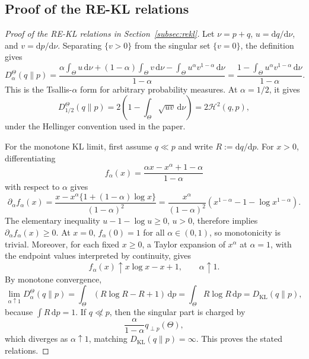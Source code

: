 \documentclass[11pt,a4paper]{article}
\theoremstyle{compactplain}
\theoremstyle{compactdefinition}
\numberwithin{equation}{section}
\begin{document}
\subsection*{Proof of the RE-KL relations}
\begin{proof}[Proof of the RE-KL relations in Section~\ref{subsec:rekl}]
Let \(\nu=p+q\), \(u=\mathrm dq/\mathrm d\nu\), and \(v=\mathrm dp/\mathrm d\nu\). Separating \(\{v>0\}\) from the singular set \(\{v=0\}\), the definition gives
\[
 D_\alpha^\Theta(q\|p)
 =\frac{\alpha\int_\Theta u\,\mathrm d\nu+(1-\alpha)\int_\Theta v\,\mathrm d\nu
       -\int_\Theta u^\alpha v^{1-\alpha}\,\mathrm d\nu}{1-\alpha}
 =\frac{1-\int_\Theta u^\alpha v^{1-\alpha}\,\mathrm d\nu}{1-\alpha}.
\]
This is the Tsallis-\(\alpha\) form for arbitrary probability measures. At \(\alpha=1/2\), it gives
\[
 D_{1/2}^\Theta(q\|p)
 =2\left(1-\int_\Theta\sqrt{uv}\,\mathrm d\nu\right)
 =2\mathcal H^2(q,p),
\]
under the Hellinger convention used in the paper.

For the monotone KL limit, first assume \(q\ll p\) and write \(R:=\mathrm dq/\mathrm dp\). For \(x>0\), differentiating
\[
 f_\alpha(x)=\frac{\alpha x-x^\alpha+1-\alpha}{1-\alpha}
\]
with respect to \(\alpha\) gives
\[
 \partial_\alpha f_\alpha(x)
 =\frac{x-x^\alpha\{1+(1-\alpha)\log x\}}{(1-\alpha)^2}
 =\frac{x^\alpha}{(1-\alpha)^2}
 \left(x^{1-\alpha}-1-\log x^{1-\alpha}\right).
\]
The elementary inequality \(u-1-\log u\ge0\), \(u>0\), therefore implies
\(\partial_\alpha f_\alpha(x)\ge0\). At \(x=0\), \(f_\alpha(0)=1\) for all
\(\alpha\in(0,1)\), so monotonicity is trivial. Moreover, for each fixed
\(x\ge0\), a Taylor expansion of \(x^\alpha\) at \(\alpha=1\), with the endpoint
values interpreted by continuity, gives
\[
 f_\alpha(x)\uparrow x\log x-x+1,
 \qquad \alpha\uparrow1 .
\]
By monotone convergence,
\[
 \lim_{\alpha\uparrow1}D_\alpha^\Theta(q\|p)
 =\int_\Theta (R\log R-R+1)\,\mathrm d p
 =\int_\Theta R\log R\,\mathrm d p
 =D_{\mathrm{KL}}(q\|p),
\]
because \(\int R\,\mathrm d p=1\). If \(q\not\ll p\), then the singular part is
charged by
\[
 \frac{\alpha}{1-\alpha}q_{\perp p}(\Theta),
\]
which diverges as \(\alpha\uparrow1\), matching
\(D_{\mathrm{KL}}(q\|p)=\infty\). This proves the stated relations.
\end{proof}
\end{document}
